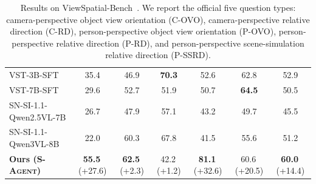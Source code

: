 \documentclass{llmxive}
\providecommand{\cone}[1]{\cellcolor{top1color}\textbf{#1}}
\providecommand{\ctwo}[1]{\cellcolor{top2color}#1}
\providecommand{\cthree}[1]{\cellcolor{top3color}#1}
\providecommand{\dpos}[1]{{\tiny\,(+#1)}}
\begin{document}
\begin{table}[t]
\begin{tabular}{lcc|ccc|c}
        VST-3B-SFT & \cthree{35.4} & 46.9 & \cone{70.3} & \cthree{52.6} & \ctwo{62.8} & \ctwo{52.9} \\
        VST-7B-SFT & 29.6 & 52.7 & 51.9 & 50.7 & \cone{64.5} & 50.5 \\
        SN-SI-1.1-Qwen2.5VL-7B & 26.7 & 47.9 & \cthree{57.1} & 43.2 & 49.7 & 45.5 \\
        SN-SI-1.1-Qwen3VL-8B & 22.0 & \cthree{60.3} & \ctwo{67.8} & 41.5 & 55.6 & \cthree{51.2} \\
        \midrule
        \textbf{Ours (\textsc{S-Agent})} & \cone{55.5}\dpos{27.6} & \cone{62.5}\dpos{2.3} & 42.2\dpos{1.2} & \cone{81.1}\dpos{32.6} & \cthree{60.6}\dpos{20.5} & \cone{60.0}\dpos{14.4} \\
        \bottomrule
    \end{tabular}%
    \vspace{-2mm}
\caption{Results on ViewSpatial-Bench~\cite{viewspatial_bench}. We report the official five question types: camera-perspective object view orientation (C-OVO), camera-perspective relative direction (C-RD), person-perspective object view orientation (P-OVO), person-perspective relative direction (P-RD), and person-perspective scene-simulation relative direction (P-SSRD).}
\end{table}
\end{document}
